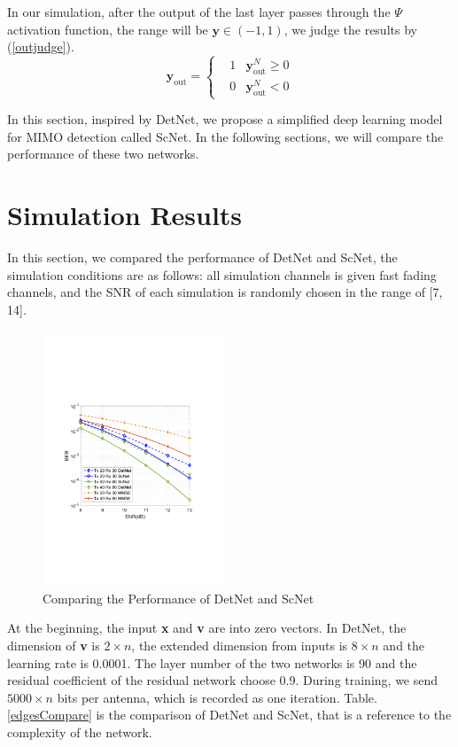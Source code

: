 \documentclass[conference]{IEEEtran}
\begin{document}
In our simulation, after the output of the last layer passes through the $\Psi$ activation function, the range will be ${\textbf{y}\in\left(-1,1\right)}$, we judge the results by (\ref{outjudge}).
\begin{equation}
\label{outjudge}
\textbf{y}_{\textrm{out}}=\left\{
\begin{aligned}
&1  &\mbox{${\textbf{y}_{\textrm{out}}^N\geqslant0}$}\\
&0  &\mbox{${\textbf{y}_{\textrm{out}}^N<0}$}
\end{aligned}
\right.
\end{equation}

In this section, inspired by DetNet, we propose a simplified deep learning model for MIMO detection called ScNet. In the following sections, we will compare the performance of these two networks.

\section{Simulation Results}

In this section, we compared the performance of DetNet and ScNet, the simulation conditions are as follows: all simulation channels is given fast fading channels, and the SNR of each simulation is randomly chosen in the range of [7, 14].
\begin{figure}[ht]
  \centering
  \includegraphics[width=0.48\textwidth]{Figcompare1.pdf}
  \caption{Comparing the Performance of DetNet and ScNet}
  \label{PerformanceCompare}
\end{figure}
At the beginning, the input \textbf{x} and \textbf{v} are into zero vectors. In DetNet, the dimension of \textbf{v} is ${2 \times n}$, the extended dimension from inputs is ${8 \times n}$ and the learning rate is 0.0001. The layer number of the two networks is 90 and the residual coefficient of the residual network choose 0.9. During training, we send ${5000 \times n}$ bits per antenna, which is recorded as one iteration. Table.\ref{edgesCompare} is the comparison of DetNet and ScNet, that is a reference to the complexity of the network.
\end{document}

